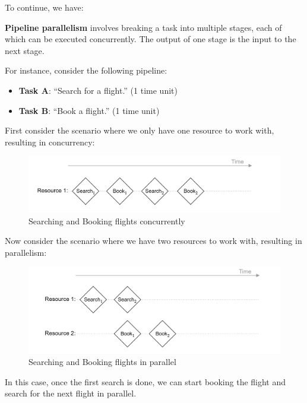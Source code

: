 \newpage 
\noindent
To continue, we have:
\begin{Def}

    \textbf{Pipeline parallelism} involves breaking a task into multiple stages, each of which can be executed concurrently. The output of one stage is the input to the next stage.
\end{Def}

For instance, consider the following pipeline:
\begin{itemize}
    \item \textbf{Task A}: ``Search for a flight.'' (1 time unit)
    \item \textbf{Task B}: ``Book a flight.'' (1 time unit)
\end{itemize}

\noindent
First consider the scenario where we only have one resource to work with, resulting in concurrency:
\begin{figure}[h]
    \centering
    \includegraphics[width=1\textwidth]{./Sections/rpc_2/ppar.png}
    \caption{Searching and Booking flights concurrently}
\end{figure}

\noindent
Now consider the scenario where we have two resources to work with, resulting in parallelism:
\begin{figure}[h]
    \centering
    \includegraphics[width=1\textwidth]{./Sections/rpc_2/ppar_2.png}
    \caption{Searching and Booking flights in parallel}
\end{figure}
\noindent
In this case, once the first search is done, we can start booking the flight and search for the next flight in parallel.
